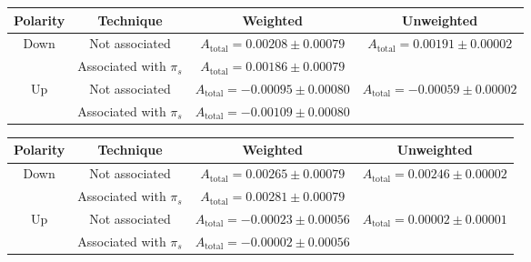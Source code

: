 \documentclass{article}
\begin{document}
        \begin{center}
                \begin{tabular}{c|c|c|c}
                        Polarity & Technique & Weighted & Unweighted\\
                        \hline\hline
                        \multirow{2}{*}{Down} & Not associated & $A_\text{total} = 0.00208\pm 0.00079$ & \multirow{2}{*}{$A_\text{total} = 0.00191\pm 0.00002$}\\
                        \cline{2-3}
                        & Associated with $\pi_s$ & $A_\text{total} = 0.00186\pm 0.00079$ & \\
                        \hline
                        \multirow{2}{*}{Up} & Not associated & $A_\text{total} = - 0.00095\pm 0.00080$ & \multirow{2}{*}{$A_\text{total} = - 0.00059 \pm 0.00002$}\\
                        \cline{2-3}
                        & Associated with $\pi_s$ & $A_\text{total} = - 0.00109\pm 0.00080$ & \\
                \end{tabular}
                \label{tab:2017}
        \end{center}
        \begin{center}
                \begin{tabular}{c|c|c|c}
                        Polarity & Technique & Weighted & Unweighted\\
                        \hline\hline
                        \multirow{2}{*}{Down} & Not associated & $A_\text{total} = 0.00265 \pm 0.00079$ & \multirow{2}{*}{$A_\text{total} = 0.00246 \pm 0.00002$}\\
                        \cline{2-3}
                        & Associated with $\pi_s$ & $A_\text{total} = 0.00281\pm 0.00079$ & \\
                        \hline
                        \multirow{2}{*}{Up} & Not associated & $A_\text{total} = - 0.00023\pm 0.00056$ & \multirow{2}{*}{$A_\text{total} = 0.00002\pm 0.00001$}\\
                        \cline{2-3}
                        & Associated with $\pi_s$ & $A_\text{total} = - 0.00002\pm 0.00056$ & \\
                \end{tabular}
                \label{tab:2018}
        \end{center}
\end{document}
